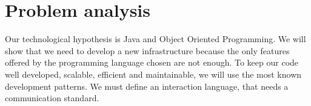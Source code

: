 \section{Problem analysis}
Our technological hypothesis is Java and Object Oriented Programming. We
will show that we need to develop a new infrastructure because the only features
offered by the programming language chosen are not enough. To keep our code
well developed, scalable, efficient and maintainable, we will use the most known
development patterns. We must define an interaction language, that needs a
communication standard.


